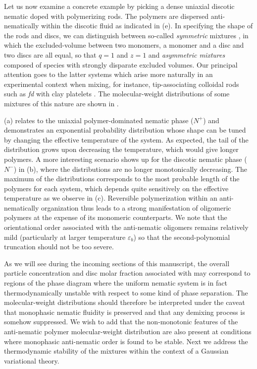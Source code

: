 Let us now examine a concrete example by picking a dense uniaxial discotic nematic  doped with polymerizing rods. The polymers are dispersed anti-nematically within the discotic fluid as indicated in (e).   In specifying the shape of the rods and discs, we can distinguish between  so-called {\em symmetric} mixtures \cite{stroobants1984}, in which the excluded-volume  between two monomers, a monomer and a disc and two discs are all equal, so that $q = 1$ and $z = 1$ and {\em asymmetric mixtures} composed of species with  strongly disparate excluded volumes.   Our principal attention goes to the latter systems which arise more naturally in an experimental context when mixing, for instance, tip-associating colloidal rods such as {\em fd} \cite{fraden-tmv-baus,dogic-fraden_fil} with clay platelets \cite{davidson-overview}. The molecular-weight distributions of some mixtures of this nature are shown in .

 (a) relates to the uniaxial polymer-dominated nematic phase ($N^+$) and demonstrates an exponential probability distribution  whose shape can be tuned by changing the effective temperature of the system. As expected, the tail of the distribution grows upon decreasing the temperature, which would give longer polymers. A more interesting scenario shows up for the discotic nematic phase ($N^-$) in (b), where the distributions are no longer monotonically decreasing. The maximum of the distributions corresponds to the most probable length of the polymers for each system, which depends quite sensitively on the effective temperature as we  observe in (c). Reversible polymerization within an anti-nematically organization  thus leads to a strong manifestation of oligomeric polymers at the expense of its monomeric counterparts. We  note that the orientational order associated with the anti-nematic oligomers remains relatively mild (particularly at larger temperature $\varepsilon_{b}$) so that the second-polynomial truncation should not be too severe.


As we will see during the incoming sections of this manuscript, the overall particle concentration and disc molar fraction  associated with  may correspond to  regions of the phase diagram where the uniform nematic system is in fact thermodynamically unstable with respect to some kind of phase separation. The molecular-weight distributions should therefore be interpreted under the caveat that monophasic nematic fluidity is preserved and that any demixing process is somehow suppressed. We wish to add that the non-monotonic features of the anti-nematic polymer molecular-weight distribution are also present at conditions where monophasic anti-nematic order is found to be stable.  Next we address the  thermodynamic stability of the mixtures  within the context of a Gaussian variational theory. 


